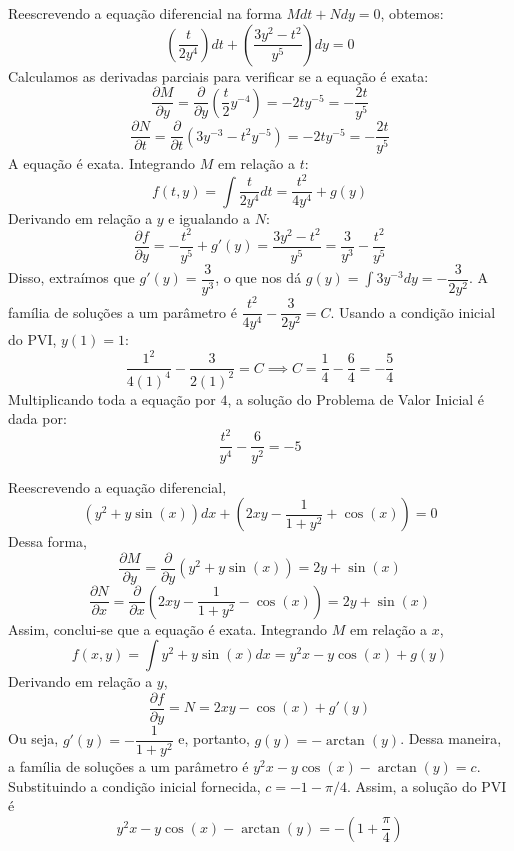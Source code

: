 \documentclass[oneside,12pt,a4paper]{report}
\begin{document}
    \begin{resolucao}
        \itemresolucao Reescrevendo a equação diferencial na forma $Mdt+Ndy=0$, obtemos:
        \[\left(\frac{t}{2y^4}\right)dt+\left(\frac{3y^2-t^2}{y^5}\right)dy=0\]
        Calculamos as derivadas parciais para verificar se a equação é exata:
        \[\frac{\partial M}{\partial y}=\frac{\partial}{\partial y}\left(\frac{t}{2}y^{-4}\right)=-2ty^{-5}=-\frac{2t}{y^5}\]
        \[\frac{\partial N}{\partial t}=\frac{\partial}{\partial t}\left(3y^{-3}-t^2y^{-5}\right)=-2ty^{-5}=-\frac{2t}{y^5}\]
        A equação é exata. Integrando $M$ em relação a $t$:
        \[f(t,y)=\int \frac{t}{2y^4}dt=\frac{t^2}{4y^4}+g(y)\]
        Derivando em relação a $y$ e igualando a $N$:
        \[\frac{\partial f}{\partial y}=-\frac{t^2}{y^5}+g'(y)=\frac{3y^2-t^2}{y^5}=\frac{3}{y^3}-\frac{t^2}{y^5}\]
        Disso, extraímos que $g'(y)=\dfrac{3}{y^3}$, o que nos dá $g(y)=\int 3y^{-3}dy=-\dfrac{3}{2y^2}$.
        A família de soluções a um parâmetro é $\dfrac{t^2}{4y^4}-\dfrac{3}{2y^2}=C$. Usando a condição inicial do PVI, $y(1)=1$:
        \[\frac{1^2}{4(1)^4}-\frac{3}{2(1)^2}=C\implies C=\frac{1}{4}-\frac{6}{4}=-\frac{5}{4}\]
        Multiplicando toda a equação por $4$, a solução do Problema de Valor Inicial é dada por:
        \[\boxed{\frac{t^2}{y^4}-\frac{6}{y^2}=-5}\]

        \itemresolucao Reescrevendo a equação diferencial,
        \[(y^2+y\sin(x))dx+\left(2xy-\frac{1}{1+y^2}+\cos(x)\right)=0\]
        Dessa forma,
        \[\frac{\partial M}{\partial y}=\frac{\partial}{\partial y}(y^2+y\sin(x))=2y+\sin(x)\]
        \[\frac{\partial N}{\partial x}=\frac{\partial}{\partial x}\left(2xy-\frac{1}{1+y^2}-\cos(x)\right)=2y+\sin(x)\]
        Assim, conclui-se que a equação é exata. Integrando $M$ em relação a $x$,
        \[f(x,y)=\int y^2+y\sin(x)dx=y^2x-y\cos(x)+g(y)\]
        Derivando em relação a $y$,
        \[\frac{\partial f}{\partial y}=N=2xy-\cos(x)+g'(y)\]
        Ou seja, $g'(y)=-\dfrac{1}{1+y^2}$ e, portanto, $g(y)=-\arctan(y)$. Dessa maneira, a família de soluções a um parâmetro é $y^2x-y\cos(x)-\arctan(y)=c$. Substituindo a condição inicial fornecida, $c=-1-\pi/4$. Assim, a solução do PVI é
        \[\boxed{y^2x-y\cos(x)-\arctan(y)=-\left(1+\frac{\pi}{4}\right)}\]
    \end{resolucao}
\end{document}

